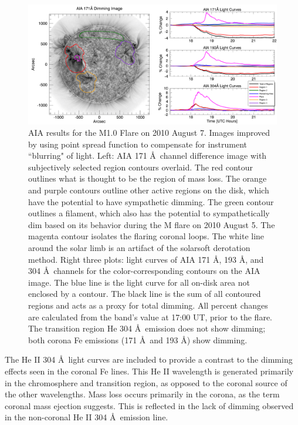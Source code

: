 \begin{figure}[!h]
    \begin{center}
	    \includegraphics[width=166mm]{Images/Aia2010Aug7.png}
    \end{center}
    \caption[AIA contour analysis for 2010 August 7 event]{
        AIA results for the M1.0 Flare on 2010 August 7. Images improved by using point spread function to compensate for 
        instrument ``blurring" of light. Left: AIA 171 \AA\ channel difference image with subjectively 
        selected region contours overlaid. The red contour outlines what is thought to be the region of mass loss. The 
        orange and purple contours outline other active regions on the disk, which have the potential to have sympathetic 
        dimming. The green contour outlines a filament, which also has the potential to sympathetically dim based on its 
        behavior during the M flare on 2010 August 5. The magenta contour isolates the flaring coronal loops. The white line 
        around the solar limb is an artifact of the solarsoft derotation method. Right three plots: light curves of AIA 171 
        \AA, 193 \AA, and 304 \AA\ channels for the color-corresponding contours on the AIA image. The blue line is the 
        light curve for all on-disk area not enclosed by a contour. The black line is the sum of all contoured regions and 
        acts as a proxy for total dimming. All percent changes are calculated from the band's value at 17:00 UT, prior to 
        the flare. The transition region He 304 \AA\ emission does not show dimming; both corona Fe emissions (171 \AA\ and 
        193 \AA) show dimming.
	}
    \label{aia2010aug7}
\end{figure}

The He II 304 \AA\ light curves are included to provide a contrast to the dimming effects seen in the coronal Fe lines. This He II wavelength is generated primarily in the chromosphere and transition region, as opposed to the coronal source of the other wavelengths. Mass loss occurs primarily in the corona, as the term coronal mass ejection suggests. This is reflected in the lack of dimming observed in the non-coronal He II 304 \AA\ emission line.

